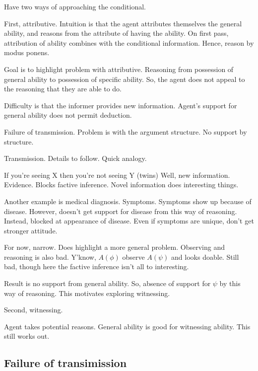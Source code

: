 \documentclass[10pt]{article}
\begin{document}
\begin{note}[Goals]
  Have two ways of approaching the conditional.

  First, attributive.
  Intuition is that the agent attributes themselves the general ability, and reasons from the attribute of having the ability.
  On first pass, attribution of ability combines with the conditional information.
  Hence, reason by modus ponens.

  Goal is to highlight problem with attributive.
  Reasoning from possession of general ability to possession of specific ability.
  So, the agent does not appeal to the reasoning that they are able to do.

  Difficulty is that the informer provides new information.
  Agent's support for general ability does not permit deduction.

  Failure of transmission.
  Problem is with the argument structure.
  No support by structure.

  Transmission.
  Details to follow.
  Quick analogy.

  If you're seeing X then you're not seeing Y (twins)
  Well, new information.
  Evidence.
  Blocks factive inference.
  Novel information does interesting things.

  Another example is medical diagnosis.
  Symptoms.
  Symptoms show up because of disease.
  However, doesn't get support for disease from this way of reasoning.
  Instead, blocked at appearance of disease.
  Even if symptoms are unique, don't get stronger attitude.

  For now, narrow.
  Does highlight a more general problem.
  Observing and reasoning is also bad.
  Y'know, \(A(\phi)\) observe \(A(\psi)\) and looks doable.
  Still bad, though here the factive inference isn't all to interesting.

  Result is no support from general ability.
  So, absence of support for \(\psi\) by this way of reasoning.
  This motivates exploring witnessing.

  Second, witnessing.

  Agent takes potential reasons.
  General ability is good for witnessing ability.
  This still works out.
\end{note}

\subsection{Failure of transimission}
\label{sec:fail-trans}
\end{document}
